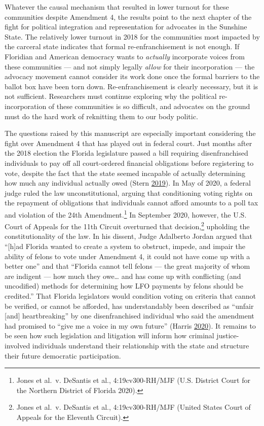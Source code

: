 \documentclass[
  12pt,
]{article}
\begin{document}
Whatever the causal mechanism that resulted in lower turnout for these communities despite Amendment 4, the results point to the next chapter of the fight for political integration and representation for advocates in the Sunshine State. The relatively lower turnout in 2018 for the communities most impacted by the carceral state indicates that formal re-enfranchisement is not enough. If Floridian and American democracy wants to \emph{actually} incorporate voices from these communities --- and not simply legally \emph{allow} for their incorporation --- the advocacy movement cannot consider its work done once the formal barriers to the ballot box have been torn down. Re-enfranchisement is clearly necessary, but it is not sufficient. Researchers must continue exploring why the political re-incorporation of these communities is so difficult, and advocates on the ground must do the hard work of reknitting them to our body politic.

The questions raised by this manuscript are especially important considering the fight over Amendment 4 that has played out in federal court. Just months after the 2018 election the Florida legislature passed a bill requiring disenfranchised individuals to pay off all court-ordered financial obligations before registering to vote, despite the fact that the state seemed incapable of actually determining how much any individual actually owed (Stern \protect\hyperlink{ref-Stern2019}{2019}). In May of 2020, a federal judge ruled the law unconstitutional, arguing that conditioning voting rights on the repayment of obligations that individuals cannot afford amounts to a poll tax and violation of the 24th Amendment.\footnote{Jones et al.~v. DeSantis et al., 4:19cv300-RH/MJF (U.S. District Court for the Northern District of Florida 2020).} In September 2020, however, the U.S. Court of Appeals for the 11th Circuit overturned that decision,\footnote{Jones et al.~v. DeSantis et al., 4:19cv300-RH/MJF (United States Court of Appeals for the Eleventh Circuit).} upholding the constitutionality of the law. In his dissent, Judge Adalberto Jordan argued that ``{[}h{]}ad Florida wanted to create a system to obstruct, impede, and impair the ability of felons to vote under Amendment 4, it could not have come up with a better one'' and that ``Florida cannot tell felons --- the great majority of whom are indigent --- how much they owe\ldots{} and has come up with conflicting (and uncodified) methods for determining how LFO payments by felons should be credited.'' That Florida legislators would condition voting on criteria that cannot be verified, or cannot be afforded, has understandably been described as ``unfair {[}and{]} heartbreaking'' by one disenfranchised individual who said the amendment had promised to ``give me a voice in my own future'' (Harris \protect\hyperlink{ref-Harris2020}{2020}). It remains to be seen how such legislation and litigation will inform how criminal justice-involved individuals understand their relationship with the state and structure their future democratic participation.
\end{document}
